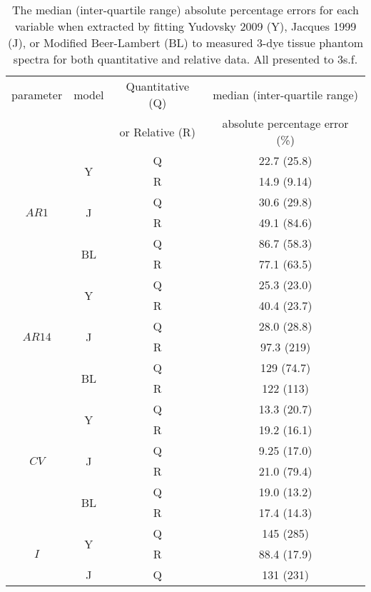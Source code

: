 \begin{table}[htb!]
    \centering
    \caption{The median (inter-quartile range) absolute percentage errors for each variable when extracted by fitting Yudovsky 2009 (Y), Jacques 1999 (J), or Modified Beer-Lambert (BL) to measured 3-dye tissue phantom spectra for both quantitative and relative data. All presented to 3s.f.}
    \begin{tabular}{|ccc|c|}
        \hline
        parameter & model & Quantitative (Q) & median (inter-quartile range) \\
        & & or Relative (R) & absolute percentage error (\%)\\
        \hline
        \multirow{6}{*}{$AR1$} & \multirow{2}{*}{Y} & Q & 22.7 (25.8) \\
        & & R & 14.9 (9.14) \\
        \cline{2-4}
        & \multirow{2}{*}{J} & Q & 30.6 (29.8) \\
        & & R & 49.1 (84.6) \\
        \cline{2-4}
        & \multirow{2}{*}{BL} & Q & 86.7 (58.3) \\
        & & R & 77.1 (63.5) \\
        \hline
        \multirow{6}{*}{$AR14$} & \multirow{2}{*}{Y} & Q & 25.3 (23.0) \\
        & & R & 40.4 (23.7) \\
        \cline{2-4}
        & \multirow{2}{*}{J} & Q & 28.0 (28.8) \\
        & & R & 97.3 (219) \\
        \cline{2-4}
        & \multirow{2}{*}{BL} & Q & 129 (74.7) \\
        & & R & 122 (113) \\
        \hline
        \multirow{6}{*}{$CV$} & \multirow{2}{*}{Y} & Q & 13.3 (20.7) \\
        & & R & 19.2 (16.1) \\
        \cline{2-4}
        & \multirow{2}{*}{J} & Q & 9.25 (17.0) \\
        & & R & 21.0 (79.4) \\
        \cline{2-4}
        & \multirow{2}{*}{BL} & Q & 19.0 (13.2) \\
        & & R & 17.4 (14.3) \\
        \hline
        \multirow{6}{*}{$I$} & \multirow{2}{*}{Y} & Q & 145 (285) \\
        & & R & 88.4 (17.9) \\
        \cline{2-4}
        & \multirow{2}{*}{J} & Q & 131 (231) \\

\end{tabular}
\end{table}
